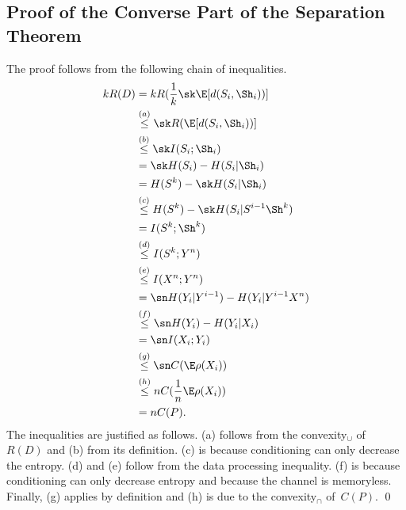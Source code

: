 

\begin{subappendices}

\section{Proof of the Converse Part of the Separation Theorem}
\label{app:separationproof}

The proof follows from the following chain of inequalities.
{\allowdisplaybreaks
\begin{align*}
  kR(D) &= k R(\frac1k \sk \E[d(S_i, \Sh_i))] \\
  &\stackrel{(a)}{\le} \sk R(\E[d(S_i, \Sh_i))] \\
  &\stackrel{(b)}{\le} \sk I(S_i; \Sh_i) \\
  &= \sk H(S_i) - H(S_i|\Sh_i) \\
  &= H(S^k) - \sk H(S_i|\Sh_i) \\
  &\stackrel{(c)}{\le} H(S^k) - \sk H(S_i|S^{i-1} \Sh^k) \\
  &=I(S^k;\Sh^k) \\
  &\stackrel{(d)}{\le} I(S^k; Y^n) \\
  &\stackrel{(e)}{\le} I(X^n; Y^n) \\
  &= \sn H(Y_i|Y^{i-1}) - H(Y_i|Y^{i-1} X^n)  \\
  &\stackrel{(f)}{\le} \sn H(Y_i) - H(Y_i|X_i) \\
  &= \sn I(X_i; Y_i) \\
  &\stackrel{(g)}{\le} \sn C(\E \rho(X_i)) \\
  &\stackrel{(h)}{\le} n C(\frac1n \E \rho(X_i)) \\
  &= n C(P).
\end{align*}}%
The inequalities are justified as follows. (a) follows from the convexity$_\cup$
of~$R(D)$ and (b) from its definition. (c) is because
conditioning can only decrease the entropy. (d) and (e) follow from the data
processing inequality. (f) is because conditioning can only decrease entropy and
because the channel is memoryless. Finally, (g) applies by definition and (h) is
due to the convexity$_\cap$ of~$C(P)$.  \hfil\qed

\end{subappendices}
